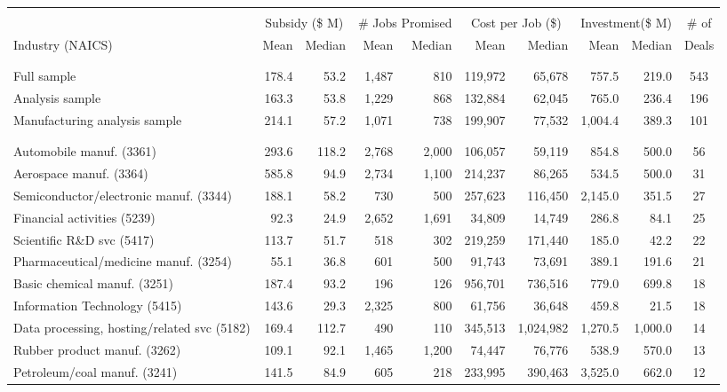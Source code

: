 \begin{tabular}{l|rr|rr|rr|rr|c}
 & & & & & & & & & \\
 & \multicolumn{2}{c|}{Subsidy (\$ M)} & \multicolumn{2}{c|}{\# Jobs Promised}                          & \multicolumn{2}{c|}{Cost per Job (\$)} & \multicolumn{2}{c|}{Investment(\$ M)}                          & \multicolumn{1}{c}{\# of} \\ 
Industry (NAICS) & Mean     & Median &      Mean &  Median & Mean & Median & Mean & Median & Deals \\
 & & & & & & & & & \\
 \hline
 & & & & & & & & & \\
Full sample&178.4&53.2&1,487&810&119,972&65,678&757.5&219.0&543\\
Analysis sample&163.3&53.8&1,229&868&132,884&62,045&765.0&236.4&196\\
Manufacturing analysis sample&214.1&57.2&1,071&738&199,907&77,532&1,004.4&389.3&101\\
 & & & & & & & & & \\
 \hline
 & & & & & & & & & \\
Automobile manuf. (3361)&293.6&118.2&2,768&2,000&106,057&59,119&854.8&500.0&56\\
Aerospace manuf. (3364)&585.8&94.9&2,734&1,100&214,237&86,265&534.5&500.0&31\\
Semiconductor/electronic manuf. (3344)&188.1&58.2&730&500&257,623&116,450&2,145.0&351.5&27\\
Financial activities (5239)&92.3&24.9&2,652&1,691&34,809&14,749&286.8&84.1&25\\
Scientific R\&D svc (5417)&113.7&51.7&518&302&219,259&171,440&185.0&42.2&22\\
Pharmaceutical/medicine manuf. (3254)&55.1&36.8&601&500&91,743&73,691&389.1&191.6&21\\
Basic chemical manuf. (3251)&187.4&93.2&196&126&956,701&736,516&779.0&699.8&18\\
Information Technology (5415)&143.6&29.3&2,325&800&61,756&36,648&459.8&21.5&18\\
Data processing, hosting/related svc (5182)&169.4&112.7&490&110&345,513&1,024,982&1,270.5&1,000.0&14\\
Rubber product manuf. (3262)&109.1&92.1&1,465&1,200&74,447&76,776&538.9&570.0&13\\
Petroleum/coal manuf. (3241)&141.5&84.9&605&218&233,995&390,463&3,525.0&662.0&12\\
\bottomrule
\end{tabular}

